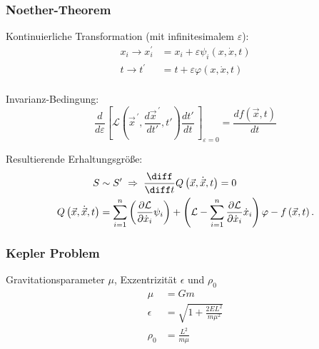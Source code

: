 \documentclass[11pt]{article}
\numberwithin{equation}{section}
\begin{document}
      \subsubsection{Noether-Theorem}
        Kontinuierliche Transformation (mit infinitesimalem $\varepsilon$):
        \begin{equation}
          \begin{aligned}
          x_i \rightarrow x_{i}^{\prime} &= x_i+\varepsilon\psi_i\left(x,\dot{x},t\right) \\
            t\rightarrow t^{\prime}\, &= t+\varepsilon\varphi\left(x,\dot{x},t\right) \\
          \end{aligned}
        \end{equation}

        Invarianz-Bedingung:
        \begin{equation}
          \frac{d}{d\varepsilon}\left[\mathcal{L}\left( {\vec{x}}^{\,\prime},\frac{d {\vec{x}}^{\,\prime}}{dt'},t'\right) \frac{dt'}{dt}\,\right]_{\varepsilon=0}=\frac{df(\vec{x}, t)}{dt}
        \end{equation}

        Resultierende Erhaltungsgröße:
        \begin{equation}
          \begin{aligned}
            S &\sim S' \;\Rightarrow\;
            \tder{}{t} Q\left(\vec{x},\dot{\vec{x}},t\right) = 0 \\
            Q\left(\vec{x},\dot{\vec{x}},t\right) &= \sum_{i=1}^{n}\left(\frac{\partial\mathcal{L}}{\partial{\dot{x}}_i}\psi_i\right)+\left(\mathcal{L}-\sum_{i=1}^{n}{\frac{\partial\mathcal{L}}{\partial{\dot{x}}_i}{\dot{x}}_i}\right)\varphi - f\left(\vec{x},t\right).
          \end{aligned}
        \end{equation}

      \subsubsection{Kepler Problem}
        Gravitationsparameter $\mu$, Exzentrizität $\epsilon$ und $\rho_0$
        \begin{equation}
          \begin{aligned}
            \mu &= G m \\
            \epsilon &= \sqrt{1+\frac{2 E L^2}{m \mu^2}} \\
            \rho_0 &= \frac{L^2}{m\mu} \\
          \end{aligned}
        \end{equation}
\end{document}
